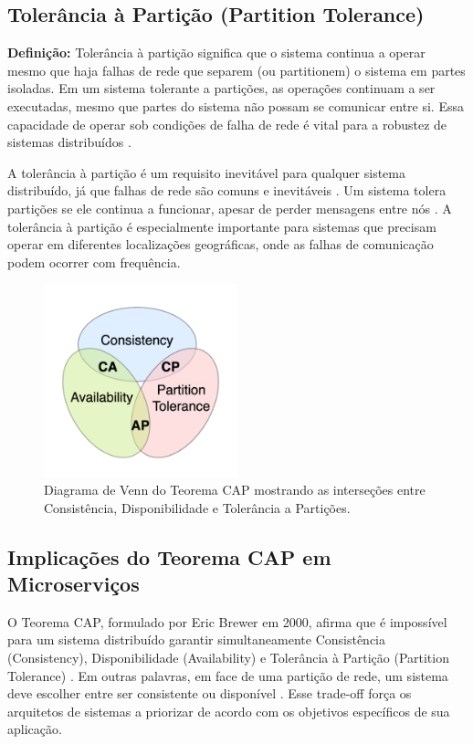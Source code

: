 \subsection{Tolerância à Partição (Partition Tolerance)}
\textbf{Definição:} Tolerância à partição significa que o sistema continua a operar mesmo que haja falhas de rede que separem (ou partitionem) o sistema em partes isoladas. Em um sistema tolerante a partições, as operações continuam a ser executadas, mesmo que partes do sistema não possam se comunicar entre si. Essa capacidade de operar sob condições de falha de rede é vital para a robustez de sistemas distribuídos \cite{brewer2000}.

A tolerância à partição é um requisito inevitável para qualquer sistema distribuído, já que falhas de rede são comuns e inevitáveis \cite{brewer2000}. Um sistema tolera partições se ele continua a funcionar, apesar de perder mensagens entre nós \cite{brewer2000}. A tolerância à partição é especialmente importante para sistemas que precisam operar em diferentes localizações geográficas, onde as falhas de comunicação podem ocorrer com frequência.

\begin{figure}[h]
    \centering
    \includegraphics[width=0.5\textwidth]{figuras/CAP_Theorem_Venn_Diagram.png}
    \caption{Diagrama de Venn do Teorema CAP mostrando as interseções entre Consistência, Disponibilidade e Tolerância a Partições.}
    \label{fig:cap_theorem}
\end{figure}

\subsection{Implicações do Teorema CAP em Microserviços}

O Teorema CAP, formulado por Eric Brewer em 2000, afirma que é impossível para um sistema distribuído garantir simultaneamente Consistência (Consistency), Disponibilidade (Availability) e Tolerância à Partição (Partition Tolerance) \cite{brewer2000}. Em outras palavras, em face de uma partição de rede, um sistema deve escolher entre ser consistente ou disponível \cite{brewer2000}. Esse trade-off força os arquitetos de sistemas a priorizar de acordo com os objetivos específicos de sua aplicação.

